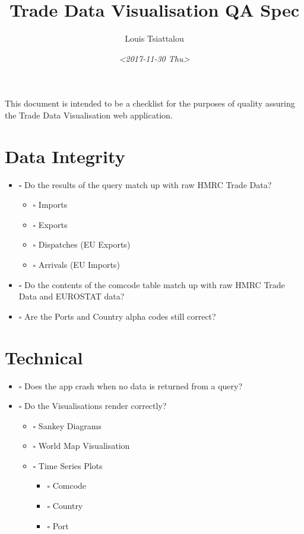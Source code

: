 \documentclass[11pt]{article}
\author{Louis Tsiattalou}
\date{\textit{<2017-11-30 Thu>}}
\title{Trade Data Visualisation QA Spec}
\begin{document}
\maketitle
This document is intended to be a checklist for the purposes of quality assuring the Trade Data Visualisation web application.

\section{Data Integrity}
\label{sec-1}
\begin{itemize}
\item $\square$ Do the results of the query match up with raw HMRC Trade Data?
\begin{itemize}
\item $\square$ Imports
\item $\square$ Exports
\item $\square$ Dispatches (EU Exports)
\item $\square$ Arrivals (EU Imports)
\end{itemize}
\item $\square$ Do the contents of the comcode table match up with raw HMRC Trade Data and EUROSTAT data?
\item $\square$ Are the Ports and Country alpha codes still correct?
\end{itemize}

\section{Technical}
\label{sec-2}
\begin{itemize}
\item $\square$ Does the app crash when no data is returned from a query?
\item $\square$ Do the Visualisations render correctly?
\begin{itemize}
\item $\square$ Sankey Diagrams
\item $\square$ World Map Visualisation
\item $\square$ Time Series Plots
\begin{itemize}
\item $\square$ Comcode
\item $\square$ Country
\item $\square$ Port
\end{itemize}
\end{itemize}
\end{itemize}
\end{document}
